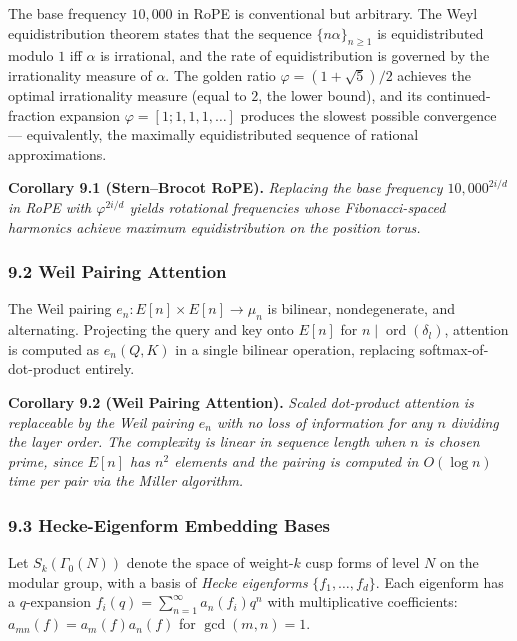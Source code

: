 \documentclass[
  11pt,
]{article}
\begin{document}
The base frequency \(10{,}000\) in RoPE is conventional but arbitrary.
The Weyl equidistribution theorem states that the sequence
\(\{n\alpha\}_{n \geq 1}\) is equidistributed modulo \(1\) iff
\(\alpha\) is irrational, and the rate of equidistribution is governed
by the irrationality measure of \(\alpha\). The golden ratio
\(\varphi = (1 + \sqrt{5})/2\) achieves the optimal irrationality
measure (equal to \(2\), the lower bound), and its continued-fraction
expansion \(\varphi = [1; 1, 1, 1, \dots]\) produces the slowest
possible convergence --- equivalently, the maximally equidistributed
sequence of rational approximations.

\textbf{Corollary 9.1 (Stern--Brocot RoPE).} \emph{Replacing the base
frequency \(10{,}000^{2i/d}\) in RoPE with \(\varphi^{2i/d}\) yields
rotational frequencies whose Fibonacci-spaced harmonics achieve maximum
equidistribution on the position torus.}

\hypertarget{weil-pairing-attention}{%
\subsubsection{9.2 Weil Pairing
Attention}\label{weil-pairing-attention}}

The Weil pairing \(e_n : E[n] \times E[n] \to \mu_n\) is bilinear,
nondegenerate, and alternating. Projecting the query and key onto
\(E[n]\) for \(n \mid \operatorname{ord}(\delta_l)\), attention is
computed as \(e_n(Q, K)\) in a single bilinear operation, replacing
softmax-of-dot-product entirely.

\textbf{Corollary 9.2 (Weil Pairing Attention).} \emph{Scaled
dot-product attention is replaceable by the Weil pairing \(e_n\) with no
loss of information for any \(n\) dividing the layer order. The
complexity is linear in sequence length when \(n\) is chosen prime,
since \(E[n]\) has \(n^2\) elements and the pairing is computed in
\(O(\log n)\) time per pair via the Miller algorithm.}

\hypertarget{hecke-eigenform-embedding-bases}{%
\subsubsection{9.3 Hecke-Eigenform Embedding
Bases}\label{hecke-eigenform-embedding-bases}}

Let \(S_k(\Gamma_0(N))\) denote the space of weight-\(k\) cusp forms of
level \(N\) on the modular group, with a basis of \emph{Hecke
eigenforms} \(\{f_1, \dots, f_d\}\). Each eigenform has a
\(q\)-expansion \(f_i(q) = \sum_{n=1}^\infty a_n(f_i) q^n\) with
multiplicative coefficients: \(a_{mn}(f) = a_m(f) a_n(f)\) for
\(\gcd(m, n) = 1\).
\end{document}
